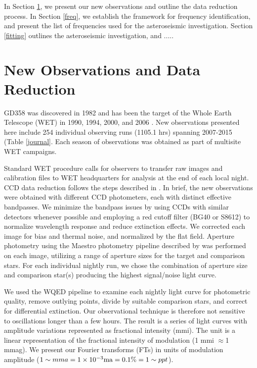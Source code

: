 \documentclass[12pt,preprint]{aastex}
\begin{document}
In Section \ref{data}, we present our new observations and outline the data reduction process.  
In Section \ref{freq}, we establish the framework for frequency identification, and present the 
list of frequencies used for the asteroseismic investigation.  Section \ref{fitting} outlines the 
asteroseismic investigation, and .....

\section {New Observations and Data Reduction}\label{data}

GD358 was discovered in 1982 \citep{Winget82} and has been the target of the Whole 
Earth Telescope (WET) in 1990, 1994, 2000, and 2006 \citep{Provencal09, Kepler03,Winget94}. 
New observations presented here include 254 individual observing runs (1105.1 hrs) spanning 
2007-2015 (Table \ref{journal}. Each season of observations was obtained as part of 
multisite WET campaigns. 

Standard WET procedure calls for observers to transfer raw images and 
calibration files to WET headquarters for analysis at the end of each local night. CCD 
data reduction follows the steps described in \citet{Provencal12}. In brief, the new observations 
were obtained with different CCD photometers, each with distinct effective bandpasses. 
We minimize the bandpass issues by using CCDs with similar detectors whenever possible and 
employing a red cutoff filter (BG40 or S8612) to normalize wavelength response and 
reduce extinction effects. We corrected each image for bias and thermal noise, and 
normalized by the flat field. Aperture photometry using the Maestro photometry pipeline 
described by \citet{Dalessio10} was performed on each image, utilizing a range of 
aperture sizes for the target and comparison stars. For each individual nightly run, we 
chose the combination of aperture size and comparison star(s) producing the highest 
signal/noise light curve. 

We used the WQED pipeline \citep{wqed} to examine each nightly light curve for photometric 
quality, remove outlying points, divide by suitable comparison stars, and correct for 
differential extinction. Our observational technique is therefore not sensitive to 
oscillations longer than a few hours. The result is a series of light curves 
with amplitude variations represented as fractional intensity (mmi). The unit is a linear 
representation of the fractional intensity of modulation (1 mmi $\approx$1 mmag). We present
our Fourier transforms (FTs) in units of modulation amplitude 
($1\sim mma=1 \times 10^{-3} {\rm ma} = 0.1 \% = 1\sim ppt$).
\end{document}
